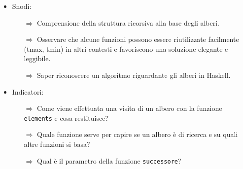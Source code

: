 \begin{itemize}
    \item Snodi:
    \begin{itemize}
        \item [$\Rightarrow$] Comprensione della struttura ricorsiva alla base degli alberi.
        \item [$\Rightarrow$] Osservare che alcune funzioni possono essere riutilizzate facilmente (tmax, tmin) in altri contesti e favoriscono una soluzione elegante e leggibile.
        \item [$\Rightarrow$] Saper riconoscere un algoritmo riguardante gli alberi in Haskell.
    \end{itemize}
    \item Indicatori:
    \begin{itemize}
        \item [$\Rightarrow$] Come viene effettuata una visita di un albero con la funzione \texttt{elements} e cosa restituisce?
        \item [$\Rightarrow$] Quale funzione serve per capire se un albero è di ricerca e su quali altre funzioni si basa?
        \item [$\Rightarrow$] Qual è il parametro della funzione \texttt{successore}?
    \end{itemize}
\end{itemize}
